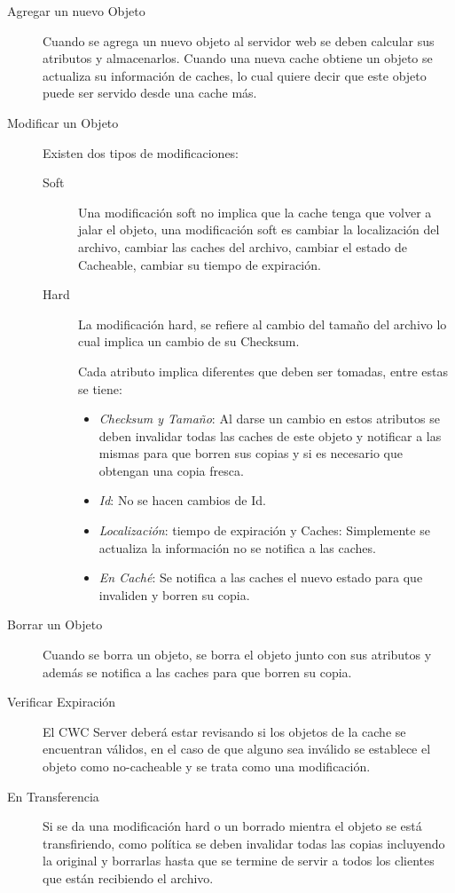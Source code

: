 \begin{description}

\item[Agregar un nuevo Objeto] Cuando se agrega un nuevo objeto al servidor web se deben calcular sus atributos y almacenarlos. Cuando una nueva cache obtiene un objeto se actualiza su información de caches, lo cual quiere decir que este objeto puede ser servido desde una cache más.

\item [Modificar un Objeto] Existen dos tipos de modificaciones: 
	\begin{description}
	\item[Soft] Una modificación soft no implica que la cache tenga que volver a jalar el objeto, una modificación soft es cambiar la localización del archivo, cambiar las caches del archivo, cambiar el estado de Cacheable, cambiar su tiempo de expiración.
	\item [Hard] La modificación hard, se refiere al cambio del tamaño del archivo lo cual implica un cambio de su Checksum.

Cada atributo implica diferentes que deben ser tomadas, entre estas se tiene:

		\begin{itemize}
		\item \textit{Checksum y Tamaño}: Al darse un cambio en estos atributos se deben invalidar todas las caches de este objeto y notificar a las mismas para que borren sus copias y si es necesario que obtengan una copia fresca.
		\item \textit{Id}: No se hacen cambios de Id.
		\item \textit{Localización}: tiempo de expiración y Caches: Simplemente se actualiza la información no se notifica a las caches.
		\item \textit{En Caché}: Se notifica a las caches el nuevo estado para que invaliden y borren su copia.
		\end{itemize}

\end{description}

\item [Borrar un Objeto] Cuando se borra un objeto, se borra el objeto junto con sus atributos y además se notifica a las caches para que borren su copia.

\item [Verificar Expiración] El CWC Server deberá estar revisando si los objetos de la cache se encuentran válidos, en el caso de que alguno sea inválido se establece el objeto como no-cacheable y se trata como una modificación. 

\item [En Transferencia] Si se da una modificación hard o un borrado mientra el objeto se está transfiriendo, como política se deben invalidar todas las copias incluyendo la original y borrarlas hasta que se termine de servir a todos los clientes que están recibiendo el archivo.

\end{description}

